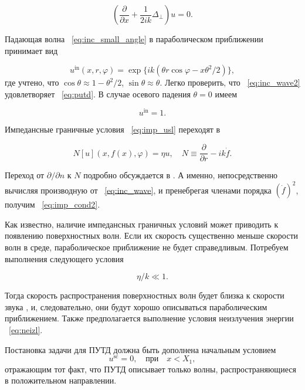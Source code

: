 \begin{equation}
\label{eq:putd}
\left(\frac{\partial}{\partial x} + \frac{1}{2ik} \Delta_\perp\right) u = 0.
\end{equation}

Падающая волна ~\eqref{eq:inc_small_angle} в параболическом приближении принимает вид

\begin{equation}
\label{eq:inc_wave2}
u^{\text{in}} (x, r, \varphi) = \exp\{ ik \left(\theta r \cos \varphi  - x\theta^2 / 2 \right) \},
\end{equation}
где учтено, что $\cos \theta \approx 1 - \theta^2/2$, $\sin \theta \approx \theta$. Легко проверить, что ~\eqref{eq:inc_wave2} удовлетворяет ~\eqref{eq:putd}. В случае осевого падения $\theta = 0$ имеем

\begin{equation}
u^{\text{in}} = 1.
\end{equation}

Импедансные граничные условия ~\eqref{eq:imp_usl} переходят в

\begin{equation}
\label{eq:imp_cond2}
N\left[u\right](x, f(x), \varphi) = \eta u, \quad N \equiv \frac{\partial}{\partial r} - ik\dot{f}.
\end{equation}

Переход от $\partial/\partial n$ к $N$ подробно обсуждается в \cite{Shanin2017}. А именно, непосредственно вычисляя производную от ~\eqref{eq:inc_wave}, и пренебрегая членами порядка $\left(\dot{f}\right)^2$, получим ~\eqref{eq:imp_cond2}.

Как известно, наличие импедансных граничных условий может приводить к появлению поверхностных волн. Если их скорость существенно меньше скорости волн в среде, параболическое приближение не будет справедливым. Потребуем выполнения следующего условия

\begin{equation}
\label{eq:potrebuem_sled}
\eta/k \ll 1.
\end{equation}

Тогда скорость распространения поверхностных волн будет близка к скорости звука \cite{Korolkov2016}, и, следовательно, они будут хорошо описываться параболическим приближением. Также предполагается выполнение условия неизлучения энергии ~\eqref{eq:neizl}.


Постановка задачи для ПУТД должна быть дополнена начальным условием
\begin{equation}
u^{\text{sc}} = 0, \quad \text{при} \quad x<X_1,
\end{equation}
отражающим тот факт, что ПУТД описывает только волны, распространяющиеся в положительном направлении.

